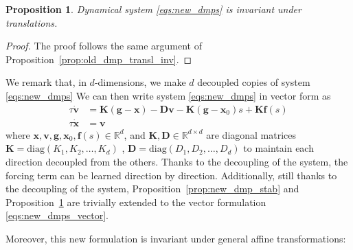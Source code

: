 \documentclass[fleqn, 11pt]{article}
\theoremstyle{definition}
\theoremstyle{plain}
\newtheorem{prop}{Proposition}[section]
\theoremstyle{remark}
\begin{document}
\begin{prop}\label{prop:new_dmp_transl_inv}
    Dynamical system \eqref{eqs:new_dmps} is invariant under translations.
\end{prop}
\begin{proof}
    The proof follows the same argument of Proposition~\ref{prop:old_dmp_transl_inv}.
\end{proof}

We remark that, in $d$-dimensions, we make $d$ decoupled copies of system \eqref{eqs:new_dmps}
We can then write system \eqref{eqs:new_dmps} in vector form as
\begin{subequations}
    \label{eqs:new_dmps_vector}
    \begin{align}
        \tau \dot{\mathbf{v}} & = \mathbf{K} (\mathbf{g} - \mathbf{x}) - \mathbf{D} \mathbf{v} - \mathbf{K} (\mathbf{g}- \mathbf{x}_0)s + \mathbf{K} \mathbf{f}(s) \label{eq:new_dmps_vector_acc} \\
        \tau \dot{\mathbf{x}} & = \mathbf{v} \label{eq:new_dmps_vector_vel}
    \end{align}
\end{subequations}
where \( \mathbf{x}, \mathbf{v}, \mathbf{g}, \mathbf{x}_0, \mathbf{f}(s) \in \mathbb{R} ^ d \), and \( \mathbf{K} , \mathbf{D} \in \mathbb{R}^{d \times d} \) are diagonal matrices
\( \mathbf{K} = \text{diag}(K_1, K_2, \ldots, K_d) \)
,
\( \mathbf{D} = \text{diag}(D_1, D_2, \ldots, D_d) \)
to maintain each direction decoupled from the others.
Thanks to the decoupling of the system, the forcing term can be learned direction by direction.
Additionally, still thanks to the decoupling of the system, Proposition~\ref{prop:new_dmp_stab} and Proposition~\ref{prop:new_dmp_transl_inv} are trivially extended to the vector formulation \eqref{eqs:new_dmps_vector}.

Moreover, this new formulation is invariant under general affine transformations:
\end{document}
